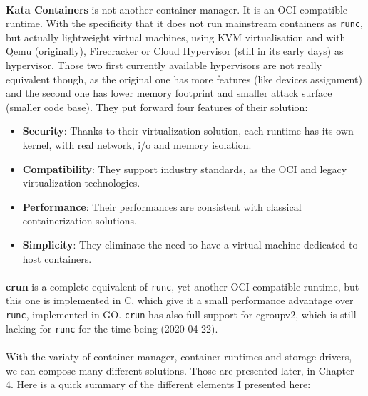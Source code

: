 \paragraph{}\textbf{Kata Containers} is not another container manager.  It is an OCI compatible runtime.  With the specificity that it does not run mainstream containers as \texttt{runc}, but actually lightweight virtual machines, using KVM virtualisation and with Qemu (originally), Firecracker or Cloud Hypervisor (still in its early days) as hypervisor.  Those two first currently available hypervisors are not really equivalent though, as the original one has more features (like devices assignment) and the second one has lower memory footprint and smaller attack surface (smaller code base).
They put forward four features of their solution:
\begin{itemize}
\renewcommand\labelitemi{--}
  \item \textbf{Security}: Thanks to their virtualization solution, each runtime has its own kernel, with real network, i/o and memory isolation.
  \item \textbf{Compatibility}:  They support industry standards, as the OCI\cite{oci} and legacy virtualization technologies.
  \item \textbf{Performance}:  Their performances are consistent with classical containerization solutions.
  \item \textbf{Simplicity}:  They eliminate the need to have a virtual machine dedicated to host containers.
\end{itemize}

\paragraph{}\textbf{crun} is a complete equivalent of \texttt{runc}, yet another OCI compatible runtime, but this one is implemented in C, which give it a small performance advantage over \texttt{runc}, implemented in GO.  \texttt{crun} has also full support for cgroupv2, which is still lacking for \texttt{runc} for the time being (2020-04-22).

\paragraph{}With the variaty of container manager, container runtimes and storage drivers, we can compose many different solutions.  Those are presented later, in Chapter 4.  Here is a quick summary of the different elements I presented here:

